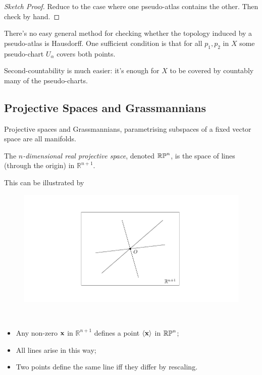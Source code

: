 \documentclass[a4paper,11pt]{article}
\begin{document}
	\begin{proof}[Sketch Proof]
		Reduce to the case where one pseudo-atlas contains the other. Then check by hand.
	\end{proof}

	There's no easy general method for checking whether the topology induced by a pseudo-atlas is Hausdorff. One sufficient condition is that for all $p_1,p_2$ in $X$ some pseudo-chart $U_\alpha$ covers both points.
	
	Second-countability is much easier: it's enough for $X$ to be covered by countably many of the pseudo-charts.

	\subsection{Projective Spaces and Grassmannians} 

	Projective spaces and Grassmannians, parametrising subspaces of a fixed vector space are all manifolds.

	\begin{defi}
		The \emph{$n$-dimensional real projective space}, denoted $\mathbb{RP}^{n}$, is the space of lines (through the origin) in $\mathbb{R}^{n+1}$.
	\end{defi}
	
	This can be illustrated by 

	\begin{figure}[H]
		\centering
		\includegraphics[width=\linewidth]{fig/fig6.pdf}
	\end{figure}

	\begin{nt}
		\
		\begin{itemize}
			\item Any non-zero $\vb x$ in $\mathbb{R}^{n+1}$ defines a point $\expval{\vb x}$ in $\mathbb{RP}^{n}$;
			\item All lines arise in this way;
			\item Two points define the same line iff they differ by rescaling.
		\end{itemize}
	\end{nt}
\end{document}
